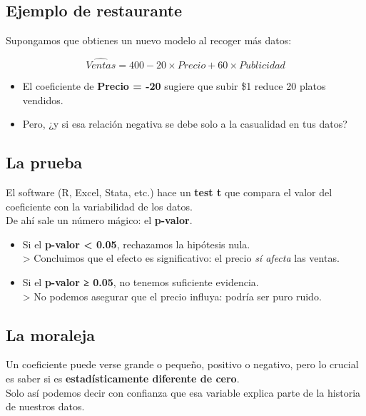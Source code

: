 \documentclass[
  spanish,
  letterpaper,
  DIV=11,
  numbers=noendperiod]{scrreprt}
\providecommand{\tightlist}{%
  \setlength{\itemsep}{0pt}\setlength{\parskip}{0pt}}
\begin{document}
\subsection{Ejemplo de restaurante 🍝}\label{ejemplo-de-restaurante}

Supongamos que obtienes un nuevo modelo al recoger más datos:

\[
\hat{Ventas} = 400 - 20 \times Precio + 60 \times Publicidad
\]

\begin{itemize}
\tightlist
\item
  El coeficiente de \textbf{Precio = -20} sugiere que subir \$1 reduce
  20 platos vendidos.\\
\item
  Pero, ¿y si esa relación negativa se debe solo a la casualidad en tus
  datos?
\end{itemize}

\subsection{La prueba}\label{la-prueba}

El software (R, Excel, Stata, etc.) hace un \textbf{test t} que compara
el valor del coeficiente con la variabilidad de los datos.\\
De ahí sale un número mágico: el \textbf{p-valor}.

\begin{itemize}
\tightlist
\item
  Si el \textbf{p-valor \textless{} 0.05}, rechazamos la hipótesis
  nula.\\
  \textgreater{} Concluimos que el efecto es significativo: el precio
  \emph{sí afecta} las ventas.\\
\item
  Si el \textbf{p-valor ≥ 0.05}, no tenemos suficiente evidencia.\\
  \textgreater{} No podemos asegurar que el precio influya: podría ser
  puro ruido.
\end{itemize}

\subsection{La moraleja}\label{la-moraleja}

Un coeficiente puede verse grande o pequeño, positivo o negativo, pero
lo crucial es saber si es \textbf{estadísticamente diferente de cero}.\\
Solo así podemos decir con confianza que esa variable explica parte de
la historia de nuestros datos.
\end{document}
